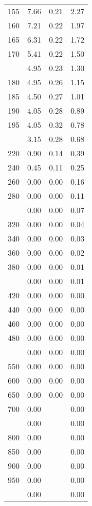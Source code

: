 \begin{table}[ht]
\begin{tabular}{lccc}
  155 & 7.66 & 0.21 & 2.27 \\ 
  160 & 7.21 & 0.22 & 1.97 \\ 
  165 & 6.31 & 0.22 & 1.72 \\ 
  170 & 5.41 & 0.22 & 1.50 \\ 
   \addlinespace
175 & 4.95 & 0.23 & 1.30 \\ 
  180 & 4.95 & 0.26 & 1.15 \\ 
  185 & 4.50 & 0.27 & 1.01 \\ 
  190 & 4.05 & 0.28 & 0.89 \\ 
  195 & 4.05 & 0.32 & 0.78 \\ 
   \addlinespace
200 & 3.15 & 0.28 & 0.68 \\ 
  220 & 0.90 & 0.14 & 0.39 \\ 
  240 & 0.45 & 0.11 & 0.25 \\ 
  260 & 0.00 & 0.00 & 0.16 \\ 
  280 & 0.00 & 0.00 & 0.11 \\ 
   \addlinespace
300 & 0.00 & 0.00 & 0.07 \\ 
  320 & 0.00 & 0.00 & 0.04 \\ 
  340 & 0.00 & 0.00 & 0.03 \\ 
  360 & 0.00 & 0.00 & 0.02 \\ 
  380 & 0.00 & 0.00 & 0.01 \\ 
   \addlinespace
400 & 0.00 & 0.00 & 0.01 \\ 
  420 & 0.00 & 0.00 & 0.00 \\ 
  440 & 0.00 & 0.00 & 0.00 \\ 
  460 & 0.00 & 0.00 & 0.00 \\ 
  480 & 0.00 & 0.00 & 0.00 \\ 
   \addlinespace
500 & 0.00 & 0.00 & 0.00 \\ 
  550 & 0.00 & 0.00 & 0.00 \\ 
  600 & 0.00 & 0.00 & 0.00 \\ 
  650 & 0.00 & 0.00 & 0.00 \\ 
  700 & 0.00 &  & 0.00 \\ 
   \addlinespace
750 & 0.00 &  & 0.00 \\ 
  800 & 0.00 &  & 0.00 \\ 
  850 & 0.00 &  & 0.00 \\ 
  900 & 0.00 &  & 0.00 \\ 
  950 & 0.00 &  & 0.00 \\ 
   \addlinespace
1000 & 0.00 &  & 0.00 \\ 
   \bottomrule
\end{tabular}
\end{table}
